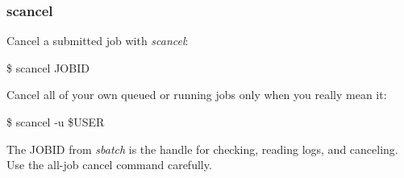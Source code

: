 \documentclass{beamer}
\begin{document}
	\begin{frame}
		\frametitle{scancel}
		Cancel a submitted job with \textit{scancel}:
		\begin{example}
			\$ scancel JOBID
		\end{example}

		Cancel all of your own queued or running jobs only when you really mean it:
		\begin{example}
			\$ scancel -u \$USER
		\end{example}

		The JOBID from \textit{sbatch} is the handle for checking, reading logs, and canceling. Use the all-job cancel command carefully.
	\end{frame}
\end{document}

